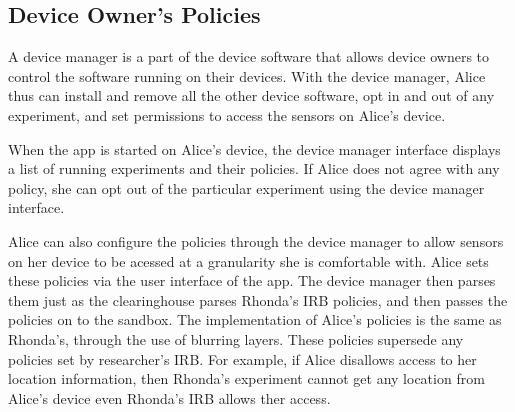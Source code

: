 

\subsection{Device Owner's Policies}\label{sec-alice-policy}
A device manager is a part of the device software that 
allows device owners to control the software running on their 
devices. With the device manager, Alice thus can install and remove 
all the other device software, opt in and out of any experiment, 
and set permissions to access the sensors on Alice's device. 

When the \sysname app is started on Alice's device, the device 
manager interface displays a list of running experiments and their policies. If 
Alice does not agree with any policy, she can opt out of the particular 
experiment using the device manager interface. 

Alice can also configure the policies through the device manager to allow
sensors on her device to be acessed at a granularity she is comfortable with.
Alice sets these policies via the user interface of the \sysname app. 
The device manager then parses them just as the clearinghouse
parses Rhonda's IRB policies, and then passes the policies on to the sandbox.
The implementation of Alice's policies is the same as Rhonda's, through
the use of blurring layers.
These policies supersede any policies set by researcher's IRB. For 
example, if Alice disallows access to her location information, then 
Rhonda's experiment cannot get any location from Alice's device even
Rhonda's IRB allows ther access. 


